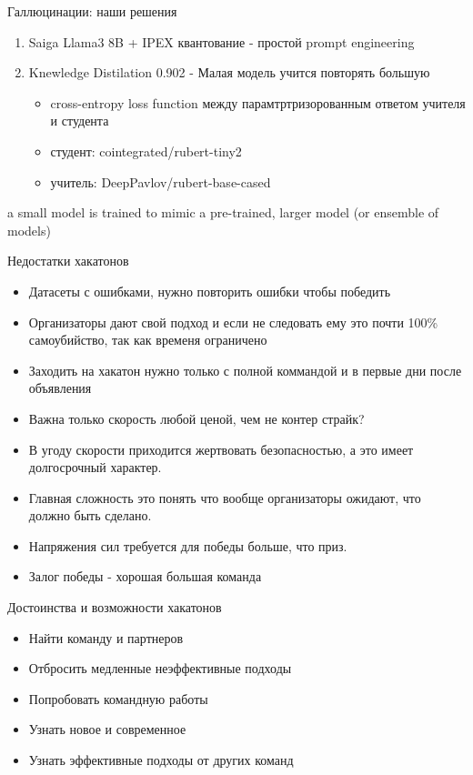 \documentclass[presentation]{beamer}
\begin{document}
\begin{frame}[label={sec:org3d1eebd}]{Галлюцинации: наши решения}
\begin{enumerate}
\item Saiga Llama3 8B + IPEX квантование - простой prompt engineering
\item Knewledge Distilation 0.902 - Малая модель учится повторять большую
\begin{itemize}
\item cross-entropy loss function между парамтртризорованным ответом учителя и студента
\item студент: cointegrated/rubert-tiny2
\item учитель: DeepPavlov/rubert-base-cased
\end{itemize}
\end{enumerate}











a small model is trained to mimic a pre-trained, larger model (or ensemble of models)
\end{frame}

\begin{frame}[label={sec:org836a163}]{Недостатки хакатонов}
\begin{itemize}
\item Датасеты с ошибками, нужно повторить ошибки чтобы победить
\item Организаторы дают свой подход и если не следовать ему это почти 100\% самоубийство, так как временя ограничено
\item Заходить на хакатон нужно только с полной коммандой и в первые дни после объявления
\item Важна только скорость любой ценой, чем не контер страйк?
\item В угоду скорости приходится жертвовать безопасностью, а это имеет долгосрочный характер.
\item Главная сложность это понять что вообще организаторы ожидают, что должно быть сделано.
\item Напряжения сил требуется для победы больше, что приз.
\item Залог победы - хорошая большая команда
\end{itemize}
\end{frame}

\begin{frame}[label={sec:org6b4d63e}]{Достоинства и возможности хакатонов}
\begin{itemize}
\item Найти команду и партнеров
\item Отбросить медленные неэффективные подходы
\item Попробовать командную работы
\item Узнать новое и современное
\item Узнать эффективные подходы от других команд
\end{itemize}
\end{frame}
\end{document}
